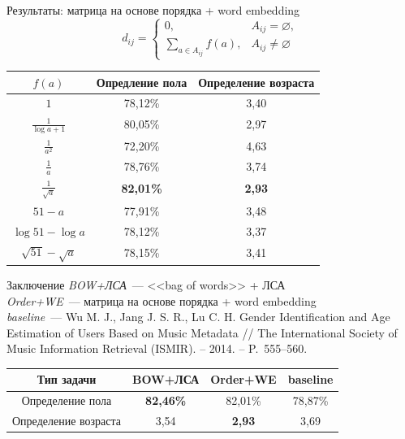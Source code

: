 \documentclass{beamer}
\newcommand{\prevGender}{78,87\%}
\newcommand{\prevAge}{3,69}
\begin{document}
\begin{frame}{Результаты: матрица на основе порядка + word embedding}
    \[d_{ij} = \begin{cases}
              0,& A_{ij} = \varnothing,\\
              \sum\limits_{a \in A_{ij}}{f(a)},& A_{ij} \ne \varnothing
          \end{cases}\]
    \begin{table}[h!]
    \centering
    \begin{tabular}{|c|c|c|}
    \hline
    \boldmath$f(a)$ & \textbf{Опредление пола} & \textbf{Определение возраста} \tabularnewline
    \hline
    $1$ & 78,12\% & 3,40 \tabularnewline
    \hline
    $\frac{1}{\log{a + 1}}$ & 80,05\% & 2,97 \tabularnewline
    \hline
    $\frac{1}{a^2}$ & 72,20\% & 4,63 \tabularnewline
    \hline
    $\frac{1}{a}$ & 78,76\% & 3,74 \tabularnewline
    \hline
    $\frac{1}{\sqrt{a}}$ & \textbf{82,01\%} & \textbf{2,93} \tabularnewline
    \hline
    $51 - a$ & 77,91\% & 3,48 \tabularnewline
    \hline
    $\log{51} - \log{a}$ & 78,12\% & 3,37 \tabularnewline
    \hline
    $\sqrt{51} - \sqrt{a}$ & 78,15\% & 3,41 \tabularnewline
    \hline
    \end{tabular}
    \label{tab:order_wordembedding}
    \end{table}
\end{frame}

\begin{frame}{Заключение}
    \textit{BOW+ЛСА}~--- <<bag of words>> + ЛСА \\
    \textit{Order+WE}~--- матрица на основе порядка + word embedding \\
    \textit{baseline}~--- Wu M. J.,
        Jang J. S. R., Lu C. H. Gender Identification
        and Age Estimation of Users Based on Music 
        Metadata // The International Society of Music Information Retrieval (ISMIR). – 2014. – P.~555--560.
    \begin{table}[h!]
    \centering
    \begin{tabular}{|c|c|c|c|}
    \hline
    \textbf{Тип задачи} & \textbf{BOW+ЛСА} & \textbf{Order+WE} & \textbf{baseline} \tabularnewline
    \hline
    Определение пола & \textbf{82,46\%} & 82,01\% & \prevGender \tabularnewline
    \hline
    Определение возраста & 3,54 & \textbf{2,93} & \prevAge \tabularnewline
    \hline
    \end{tabular}
    \label{tab:total_results}
    \end{table}
\end{frame}

\begin{frame}
    \titlepage
\end{frame}
\end{document}
